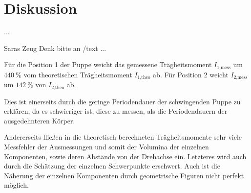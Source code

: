\section{Diskussion}
\label{sec:Diskussion}

...

Saras Zeug
Denk bitte an /text
...

Für die Position 1 der Puppe weicht das gemessene Trägheitsmoment $I_\text{1,mess}$ um 
$\SI{440}{\percent}$ vom theoretischen Trägheitsmoment $I_\text{1,theo}$ ab. Für Position 2
weicht $I_\text{2,mess}$ um $\SI{142}{\percent}$ von $I_\text{2,theo}$ ab.

Dies ist einerseits durch die geringe Periodendauer der schwingenden Puppe zu erklären,
da es schwieriger ist, diese zu messen, als die Periodendauern der ausgedehnteren Körper.

Andererseits fließen in die theoretisch berechneten Trägheitsmomente sehr viele Messfehler
der Ausmessungen und somit der Volumina der einzelnen Komponenten, sowie deren Abstände 
von der Drehachse ein.
Letzteres wird auch durch die Schätzung der einzelnen Schwerpunkte erschwert. 
Auch ist die Näherung der einzelnen Komponenten durch geometrische Figuren nicht
perfekt möglich.
